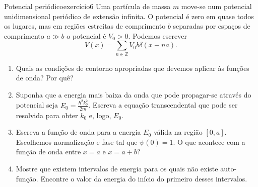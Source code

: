 
\begin{exercício}{Potencial periódico}{exercício6}
    Uma partícula de massa \(m\) move-se num potencial unidimensional periódico de extensão infinita. O potencial é zero em quase todos os lugares, mas em regiões estreitas de comprimento \(b\) separadas por espaços de comprimento \(a \gg b\) o potencial é \(V_0 > 0\). Podemos escrever
    \begin{equation*}
        V(x) = \sum_{n \in \mathbb{Z}} V_0 b \delta(x - na).
    \end{equation*}
    \begin{enumerate}[label=(\alph*)]
        \item Quais as condições de contorno apropriadas que devemos aplicar às funções de onda? Por quê?
        \item Suponha que a energia mais baixa da onda que pode propagar-se através do potencial seja \(E_0 = \frac{\hbar^2 k_0^2}{2m}\). Escreva a equação transcendental que pode ser resolvida para obter \(k_0\) e, logo, \(E_0\).
        \item Escreva a função de onda para a energia \(E_0\) válida na região \([0,a]\). Escolhemos normalização e fase tal que \(\psi(0) = 1\). O que acontece com a função de onda entre \(x = a\) e \(x = a+b\)?
        \item Mostre que existem intervalos de energia para os quais não existe auto-função. Encontre o valor da energia do início do primeiro desses intervalos.
    \end{enumerate}
\end{exercício}
